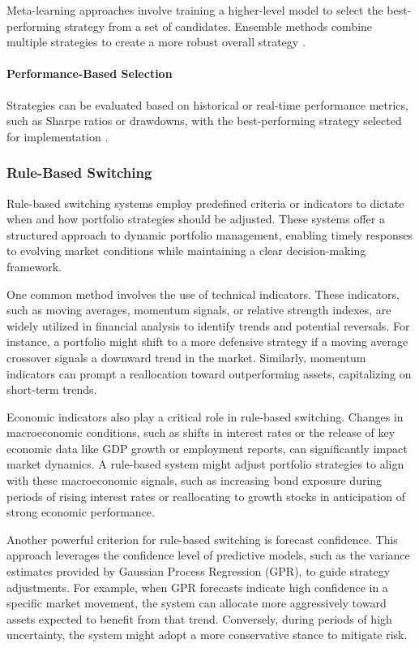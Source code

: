 Meta-learning approaches involve training a higher-level model to select the best-performing strategy from a set of candidates. Ensemble methods combine multiple strategies to create a more robust overall strategy \cite{huang2019building}.

\paragraph{Performance-Based Selection}

Strategies can be evaluated based on historical or real-time performance metrics, such as Sharpe ratios or drawdowns, with the best-performing strategy selected for implementation \cite{poterba2000portfolio}.

\subsubsection{Rule-Based Switching}
Rule-based switching systems employ predefined criteria or indicators to dictate when and how portfolio strategies should be adjusted. These systems offer a structured approach to dynamic portfolio management, enabling timely responses to evolving market conditions while maintaining a clear decision-making framework.

One common method involves the use of technical indicators. These indicators, such as moving averages, momentum signals, or relative strength indexes, are widely utilized in financial analysis to identify trends and potential reversals. For instance, a portfolio might shift to a more defensive strategy if a moving average crossover signals a downward trend in the market. Similarly, momentum indicators can prompt a reallocation toward outperforming assets, capitalizing on short-term trends.

Economic indicators also play a critical role in rule-based switching. Changes in macroeconomic conditions, such as shifts in interest rates or the release of key economic data like GDP growth or employment reports, can significantly impact market dynamics. A rule-based system might adjust portfolio strategies to align with these macroeconomic signals, such as increasing bond exposure during periods of rising interest rates or reallocating to growth stocks in anticipation of strong economic performance.

Another powerful criterion for rule-based switching is forecast confidence. This approach leverages the confidence level of predictive models, such as the variance estimates provided by Gaussian Process Regression (GPR), to guide strategy adjustments. For example, when \ac{GPR} forecasts indicate high confidence in a specific market movement, the system can allocate more aggressively toward assets expected to benefit from that trend. Conversely, during periods of high uncertainty, the system might adopt a more conservative stance to mitigate risk.

